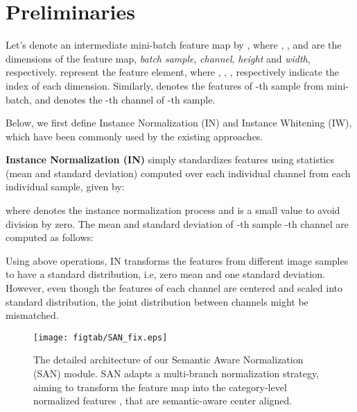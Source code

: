 \documentclass[10pt,twocolumn,letterpaper]{article}
\begin{document}
\section{Preliminaries}




Let's denote an intermediate mini-batch feature map by , where , ,  and  are the dimensions of the feature map, \ie \textit{batch sample}, \textit{channel}, \textit{height} and \textit{width}, respectively.
 represent the feature element, where , , ,  respectively indicate the index of each dimension.
Similarly,  denotes the features of -th sample from mini-batch, and  denotes the -th channel of -th sample. 

Below, we first define Instance Normalization (IN) and Instance Whitening (IW), which have been commonly used by the existing approaches.












\textbf{Instance Normalization (IN)} simply standardizes features using statistics (\ie mean and standard deviation) computed over each individual channel from each individual sample, given by:

where  denotes the instance normalization process and  is a small value to avoid division by zero. The mean  and standard deviation  of -th sample -th channel are computed as follows:
\vspace{-2mm}



Using above operations, IN transforms the features from different image samples to have a standard distribution, i.e, zero mean and one standard deviation. However, even though the features of each channel are centered and scaled into standard distribution, the joint distribution between channels might be mismatched.




\begin{figure*}[t]
    \centering{}\vspace{-0mm}
     \texttt{[image: figtab/SAN\_fix.eps]} 
     \caption{The detailed architecture of our Semantic Aware Normalization (SAN) module. SAN adapts a multi-branch normalization strategy, aiming to transform the feature map  into the category-level normalized features , that are  semantic-aware center aligned.
     }
    \label{fig3}\vspace{-4mm}
    
    \end{figure*}
\end{document}
